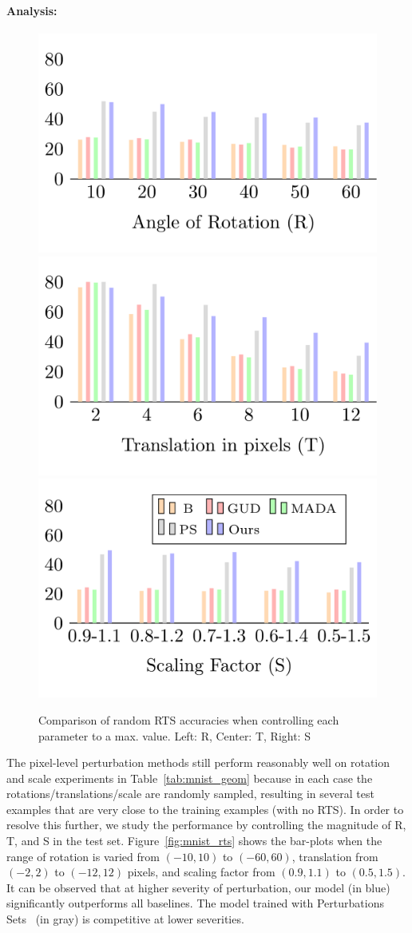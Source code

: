     \paragraph{Analysis:}
     \begin{figure}
        \centering
        \includegraphics[width=0.45\linewidth]{agat/images/ablation_r.pdf}
        \includegraphics[width=0.45\linewidth]{agat/images/ablation_t.pdf}
        \includegraphics[width=0.45\linewidth]{agat/images/ablation_s.pdf}
        \caption{Comparison of random RTS accuracies when controlling each parameter to a max. value. Left: R, Center: T, Right: S}
    \end{figure}
    
    The pixel-level perturbation methods still perform reasonably well on rotation and scale experiments in Table~\ref{tab:mnist_geom} because in each case the rotations/translations/scale are randomly sampled, resulting in several test examples that are very close to the training examples (with no RTS). In order to resolve this further, we study the performance by controlling the magnitude of R, T, and S in the test set. Figure~\ref{fig:mnist_rts} shows the bar-plots when the range of rotation is varied from $(-10, 10)$ to $(-60, 60)$, translation from $(-2, 2)$ to $(-12, 12)$ pixels, and scaling factor from $(0.9, 1.1)$ to $(0.5, 1.5)$.
    It can be observed that at higher severity of perturbation, our model (in blue) significantly outperforms all baselines.
    The model trained with Perturbations Sets~\citep{wong2020learning} (in gray) is competitive at lower severities.

